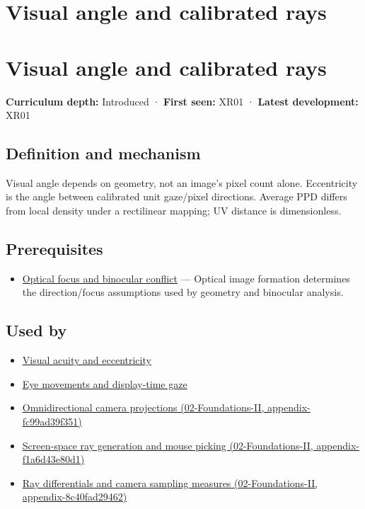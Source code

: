 \hypertarget{appendix-7d356c396d1a}{}
\section*{Visual angle and calibrated rays}
\section{Visual angle and calibrated rays}\label{visual-angle-and-calibrated-rays}

\textbf{Curriculum depth:} Introduced · \textbf{First seen:} XR01 · \textbf{Latest development:} XR01

\subsection{Definition and mechanism}\label{definition-and-mechanism}

Visual angle depends on geometry, not an image's pixel count alone. Eccentricity is the angle between calibrated unit gaze/pixel directions. Average PPD differs from local density under a rectilinear mapping; UV distance is dimensionless.

\subsection{Prerequisites}\label{prerequisites}

\begin{itemize}
\tightlist
\item
  \hyperref[appendix-f90cee1be7a4]{Optical focus and binocular conflict} --- Optical image formation determines the direction/focus assumptions used by geometry and binocular analysis.
\end{itemize}

\subsection{Used by}\label{used-by}

\begin{itemize}
\item
  \hyperref[appendix-b491fc48c54b]{Visual acuity and eccentricity}
\item
  \hyperref[appendix-a6f2c4fe1996]{Eye movements and display-time gaze}
\item
  \href{}{Omnidirectional camera projections (02-Foundations-II, appendix-fc99ad39f351)}
\item
  \href{}{Screen-space ray generation and mouse picking (02-Foundations-II, appendix-f1a6d43e80d1)}
\item
  \href{}{Ray differentials and camera sampling measures (02-Foundations-II, appendix-8c40fad29462)}
\end{itemize}

